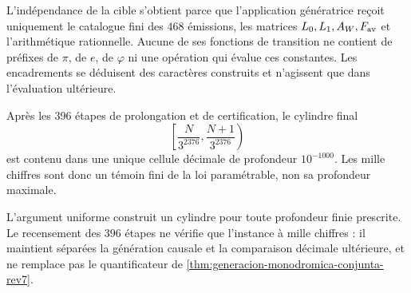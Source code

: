 L'indépendance de la cible s'obtient parce que l'application génératrice reçoit
uniquement le catalogue fini des \(468\) émissions, les matrices
\(L_0,L_1,A_W,F_{\rm av}\) et l'arithmétique rationnelle. Aucune de ses fonctions
de transition ne contient de préfixes de \(\pi\), de \(e\), de \(\varphi\) ni une
opération qui évalue ces constantes. Les encadrements se déduisent des
caractères construits et n'agissent que dans l'évaluation ultérieure.

Après les 396 étapes de prolongation et de certification, le cylindre final
\[
 \left[\frac{N}{3^{2376}},\frac{N+1}{3^{2376}}\right)
\]
est contenu dans une unique cellule décimale de profondeur \(10^{-1000}\).
Les mille chiffres sont donc un témoin fini de la loi paramétrable, non
sa profondeur maximale.

L'argument uniforme construit un cylindre pour toute profondeur
finie prescrite. Le recensement des \(396\) étapes ne vérifie que l'instance à
mille chiffres : il maintient séparées la génération causale et la comparaison décimale
ultérieure, et ne remplace pas le quantificateur de
\cref{thm:generacion-monodromica-conjunta-rev7}.
